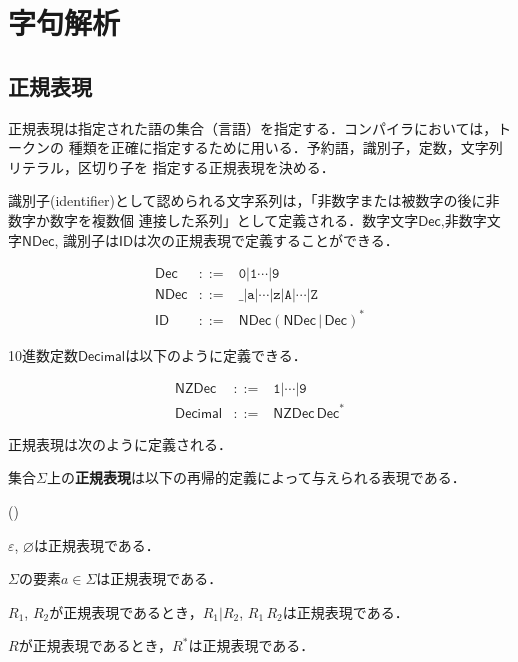 \documentclass[a4j,dvipdfmx]{jbook}
\begin{document}
\chapter{字句解析}

\section{正規表現}

正規表現は指定された語の集合（言語）を指定する．コンパイラにおいては，トークンの
種類を正確に指定するために用いる．予約語，識別子，定数，文字列リテラル，区切り子を
指定する正規表現を決める．

識別子(identifier)として認められる文字系列は，「非数字または被数字の後に非数字か数字を複数個
連接した系列」として定義される．数字文字$\mathsf{Dec}$,非数字文字$\mathsf{NDec}$,
識別子は$\mathsf{ID}$は次の正規表現で定義することができる．

\[\begin{array}{rcl}
  \mathsf{Dec} & \mathtt{::=} & \texttt{0}|\texttt{1}\cdots|\texttt{9}\\
  \mathsf{NDec} & \mathtt{::=} & \texttt{\_}|\texttt{a}|\cdots|\texttt{z}|\texttt{A}|\cdots|\texttt{Z}\\
  \mathsf{ID} & \mathtt{::=} & \mathsf{NDec}(\mathsf{NDec}\,|\,\mathsf{Dec})^\ast
\end{array}\]

10進数定数$\mathsf{Decimal}$は以下のように定義できる．

\[\begin{array}{rcl}
  \mathsf{NZDec} &\mathtt{::=}& \texttt{1}|\cdots|\texttt{9}\\
  \mathsf{Decimal}&\mathtt{::=}&\mathsf{NZDec}\,\mathsf{Dec}^\ast
\end{array}\]

正規表現は次のように定義される．

\begin{Def}
  集合$\Sigma$上の{\bf 正規表現}は以下の再帰的定義によって与えられる表現である．
  \begin{list}{()}{}
    \item\label{firstR} $\varepsilon$, $\varnothing$は正規表現である．
    \item\label{secondR} $\Sigma$の要素$a\in\Sigma$は正規表現である．
    \item\label{thirdR} $R_1$, $R_2$が正規表現であるとき，$R_1|R_2$, $R_1\,R_2$は正規表現である．
    \item\label{fourthR} $R$が正規表現であるとき，$R^\ast$は正規表現である．
  \end{list}
\end{Def}
\end{document}
